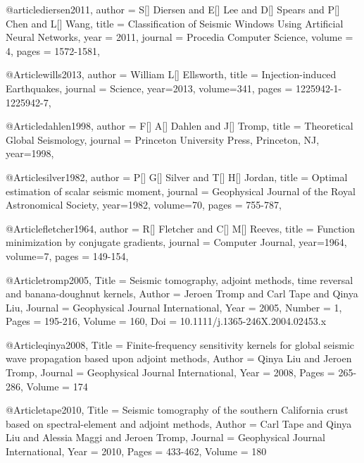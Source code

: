 @article{diersen2011,
author = {S[] Diersen and E[] Lee and D[] Spears and P[] Chen and L[] Wang},
title = {Classification of Seismic Windows Using Artificial Neural Networks},
year = {2011},
journal = {Procedia Computer Science},
volume = {4},
pages = {1572-1581},
}

@Article{wills2013,
  author =	 {William L[] Ellsworth},
  title =	 {Injection-induced Earthquakes},
  journal =	 {Science},
  year=2013,
  volume=341,
  pages =	 {1225942-1-1225942-7},
}

@Article{dahlen1998,
  author =	 {F[] A[] Dahlen and J[] Tromp},
  title =	 {Theoretical Global Seismology},
  journal =	 {Princeton University Press, Princeton, NJ},
  year=1998,
}

@Article{silver1982,
  author =	 {P[] G[] Silver and T[] H[] Jordan},
  title =	 {Optimal estimation of scalar seismic moment},
  journal =	 {Geophysical Journal of the Royal Astronomical Society},
  year=1982,
  volume=70,
  pages =	 {755-787},
}


@Article{fletcher1964,
  author =	 {R[] Fletcher and C[] M[] Reeves},
  title =	 {Function minimization by conjugate gradients},
  journal =	 {Computer Journal},
  year=1964,
  volume=7,
  pages =	 {149-154},
}

@Article{tromp2005,
  Title                    = {Seismic tomography, adjoint methods, time reversal and banana-doughnut kernels},
  Author                   = {Jeroen Tromp and Carl Tape and Qinya Liu},
  Journal                  = {Geophysical Journal International},
  Year                     = {2005},
  Number                   = {1},
  Pages                    = {195-216},
  Volume                   = {160},
  Doi                      = {10.1111/j.1365-246X.2004.02453.x}
}

@Article{qinya2008,
  Title                    = {Finite-frequency sensitivity kernels for global seismic wave propagation based upon adjoint methods},
  Author                   = {Qinya Liu and Jeroen Tromp},
  Journal                  = {Geophysical Journal International},
  Year                     = {2008},
  Pages                    = {265-286},
  Volume                   = {174}
}


@Article{tape2010,
  Title                    = {Seismic tomography of the southern {C}alifornia crust based on spectral-element and adjoint methods},
  Author                   = {Carl Tape and Qinya Liu and Alessia Maggi and Jeroen Tromp},
  Journal                  = Geophysical Journal International,
  Year                     = {2010},
  Pages                    = {433-462},
  Volume                   = {180}
}

